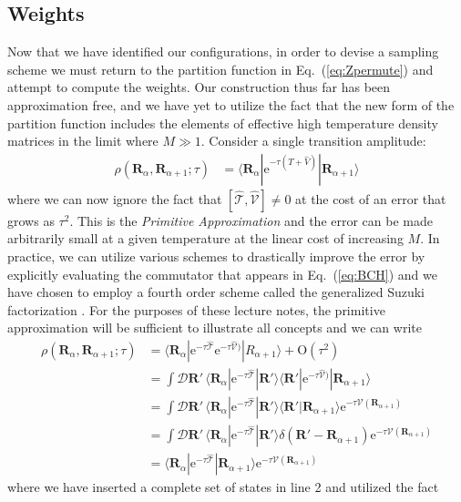 \documentclass[prb,aps,amssym,nofootinbib,floatfix,notitlepage]{revtex4-1}
\renewcommand{\vec}[1]{\boldsymbol{#1}}
\newcommand{\e}[1]{\mathrm{e}^{#1}}
\renewcommand{\eqref}[1]{Eq.~(\ref{#1})}
\newcommand{\R}{\vec{R}}
\newcommand{\T}{\mathcal{T}}
\begin{document}
\subsection{Weights}
Now that we have identified our configurations, in order to devise a sampling
scheme we must return to the partition function in \eqref{eq:Zpermute} and
attempt to compute the weights.  Our construction thus far has been
approximation free, and we have yet to utilize the fact that the new form of
the partition function includes the elements of effective high temperature
density matrices in the limit where $M \gg 1$. Consider a single transition
amplitude:
%
\begin{align}
\rho(\R_\alpha, \R_{\alpha+1}; \tau) &= \langle \R_\alpha | \e{-\tau(\hat{T} +
\hat{V})}|\R_{\alpha+1}\rangle
\end{align}
%
where we can now ignore the fact that $[\hat{\mathcal{T}},\hat{\mathcal{V}}]
\ne 0$ at the cost of an error that grows as $\tau^2$.  This is the
\emph{Primitive Approximation} and the error can be made arbitrarily small at a
given temperature at the linear cost of increasing $M$.  In practice, we can
utilize various schemes to drastically improve the error by explicitly
evaluating the commutator that appears in \eqref{eq:BCH} and we have chosen to 
employ a fourth order scheme called the generalized Suzuki factorization
\cite{Jang:2001cl}. For the purposes of these lecture notes, the primitive
approximation will be sufficient to illustrate all concepts and we can write
%
\begin{align}
    \rho(\R_\alpha, \R_{\alpha+1}; \tau) &= \langle \R_\alpha | 
    \e{-\tau\hat{\mathcal{T}}} \e{-\tau\hat{\mathcal{V}})}|R_{\alpha+1}\rangle + \mathrm{O}(\tau^2)
\nonumber \\
&= \int \mathcal{D}\R'\, \langle \R_\alpha | 
\e{-\tau\hat{\T}}|\R'\rangle \langle \R' | \e{-\tau\hat{\mathcal{V}})}|\R_{\alpha+1}\rangle 
\nonumber \\
&= \int \mathcal{D}\R'\, \langle \R_\alpha | 
\e{-\tau\hat{\T}}|\R'\rangle \langle \R' |\R_{\alpha+1}\rangle \e{-\tau
\mathcal{V}(\R_{\alpha+1})} \nonumber \\
&= \int \mathcal{D}\R'\, \langle \R_\alpha | 
\e{-\tau\hat{\T}}|\R'\rangle \delta (\R'-\R_{\alpha+1}) \e{-\tau
\mathcal{V}(\R_{\alpha+1})} \nonumber \\
&=  \langle \R_\alpha | \e{-\tau\hat{\T}}|\R_{\alpha+1}\rangle  \e{-\tau
\mathcal{V}(\R_{\alpha+1})} 
\label{eq:rhoPrimitive}
\end{align}
%
where we have inserted a complete set of states in line 2 and utilized the fact
\end{document}
